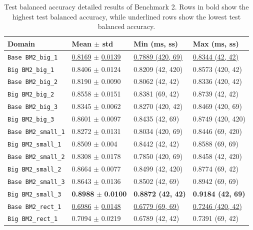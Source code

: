 \begin{table}[htbp]
    \centering
    \caption{Test balanced accuracy detailed results of Benchmark 2. Rows in bold show the highest test balanced accuracy, while underlined rows show the lowest test balanced accuracy.}
    \label{tab:bm2_bal_acc_detail}
    \begin{tabular}{llll}
        \toprule
        \textbf{Domain} & \textbf{Mean $\pm$ std} & \textbf{Min (ms, ss)} & \textbf{Max (ms, ss)}\\
        \midrule 

        \texttt{Base BM2\_big\_1} & \underline{0.8169} $\pm$ \underline{0.0139} & \underline{0.7889 (420, 69)} & \underline{0.8344 (42, 42)}\\
        \texttt{Big BM2\_big\_1} & 0.8406 $\pm$ 0.0124 & 0.8209 (42, 420) & 0.8573 (420, 42) \\
        \texttt{Base BM2\_big\_2} & 0.8190 $\pm$ 0.0090 & 0.8062 (42, 42) & 0.8336 (420, 42)\\
        \texttt{Big BM2\_big\_2} & 0.8558 $\pm$ 0.0151 & 0.8381 (69, 42) & 0.8739 (42, 42) \\
        \texttt{Base BM2\_big\_3} & 0.8345 $\pm$ 0.0062 & 0.8270 (420, 42) & 0.8469 (420, 69)\\
        \texttt{Big BM2\_big\_3} & 0.8601 $\pm$ 0.0097 & 0.8435 (42, 69) & 0.8749 (420, 420) \\
        \midrule
        \texttt{Base BM2\_small\_1} & 0.8272 $\pm$ 0.0131 & 0.8034 (420, 69) & 0.8446 (69, 420)\\
        \texttt{Big BM2\_small\_1} & 0.8509 $\pm$ 0.004 & 0.8442 (42, 42) & 0.8588 (69, 69) \\
        \texttt{Base BM2\_small\_2} & 0.8308 $\pm$ 0.0178 & 0.7850 (420, 69) & 0.8458 (42, 420)\\
        \texttt{Big BM2\_small\_2} & 0.8664 $\pm$ 0.0077 & 0.8499 (42, 420) & 0.8774 (69, 42) \\
        \texttt{Base BM2\_small\_3} & 0.8643 $\pm$ 0.0136 & 0.8502 (42, 69) & 0.8942 (69, 69)\\
        \texttt{Big BM2\_small\_3} & \textbf{0.8988} $\pm$ \textbf{0.0100} & \textbf{0.8872 (42, 42)} & \textbf{0.9184 (42, 69)} \\
        \midrule
        \texttt{Base BM2\_rect\_1} & \underline{0.6986} $\pm$ \underline{0.0148} & \underline{0.6779 (69, 69)} & \underline{0.7246 (420, 42)}\\
        \texttt{Big BM2\_rect\_1} & 0.7094 $\pm$ 0.0219 & 0.6789 (42, 42) & 0.7391 (69, 42) \\

\end{tabular}
\end{table}
